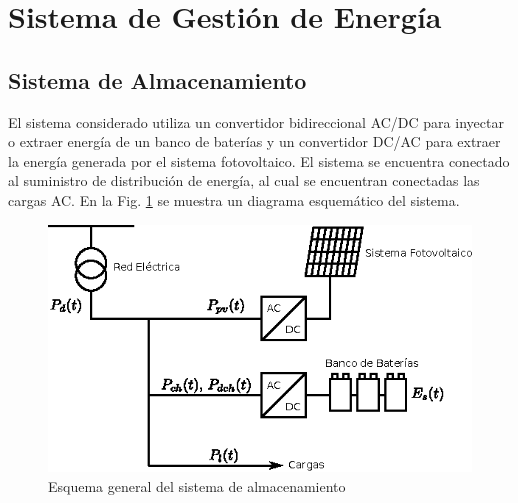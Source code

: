 \section{Sistema de Gestión de Energía}\label{sec:sistemaGestion}

\subsection{Sistema de Almacenamiento} \label{sec:sistemaAlmacenamiento}
El sistema considerado utiliza un convertidor bidireccional AC/DC para inyectar o extraer energía de un banco de baterías y un convertidor DC/AC para extraer la energía generada por el sistema fotovoltaico. El sistema se encuentra conectado al suministro de distribución de energía, al cual se encuentran conectadas las cargas AC. En la Fig. \ref{fig:sistemaAlmacenamiento} se muestra un diagrama esquemático del sistema.
\begin{figure}
	\centering
	\includegraphics[width=12cm]{img/sistema_almacenamiento.eps}
	\caption{Esquema general del sistema de almacenamiento}
	\label{fig:sistemaAlmacenamiento}
\end{figure}

